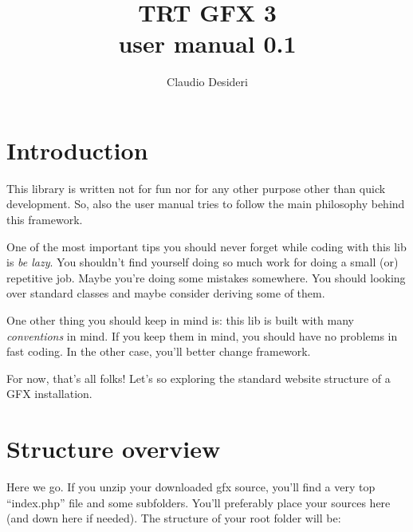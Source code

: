 \documentclass[a4paper,10pt]{article}
\title{TRT GFX 3\\\small{user manual 0.1}}
\author{Claudio Desideri}
\date{}
\begin{document}
\maketitle

\section{Introduction}
This library is written not for fun nor for any other purpose other than quick development.
So, also the user manual tries to follow the main philosophy behind this framework.

One of the most important tips you should never forget while coding with this lib is \emph{be lazy}.
You shouldn't find yourself doing so much work for doing a small (or) repetitive job.
Maybe you're doing some mistakes somewhere.
You should looking over standard classes and maybe consider deriving some of them.

One other thing you should keep in mind is: this lib is built with many \emph{conventions} in mind.
If you keep them in mind, you should have no problems in fast coding.
In the other case, you'll better change framework.

For now, that's all folks! Let's so exploring the standard website structure of a GFX installation.

\section{Structure overview}
Here we go. If you unzip your downloaded gfx source,
you'll find a very top ``index.php'' file and some subfolders.
You'll preferably place your sources here (and down here if needed).
The structure of your root folder will be:
\end{document}
